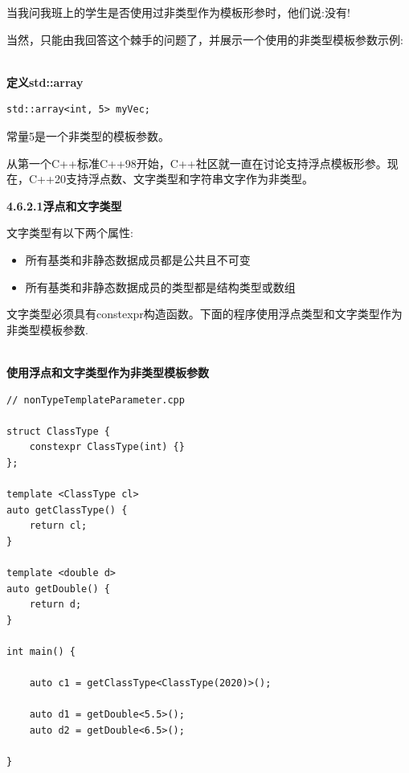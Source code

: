 \begin{tcolorbox}[breakable,enhanced jigsaw,colback=mygreen!5!white,colframe=mygreen!75!black,title={典型的非类型模板参数}]
	
当我问我班上的学生是否使用过非类型作为模板形参时，他们说:没有!

当然，只能由我回答这个棘手的问题了，并展示一个使用的非类型模板参数示例:

\hspace*{\fill} \\ %
\noindent
\textbf{定义std::array}
\begin{lstlisting}[style=styleCXX]
std::array<int, 5> myVec;
\end{lstlisting}

常量5是一个非类型的模板参数。
\end{tcolorbox}	

从第一个C++标准C++98开始，C++社区就一直在讨论支持浮点模板形参。现在，C++20支持浮点数、文字类型和字符串文字作为非类型。

\noindent
\textbf{4.6.2.1\hspace{0.2cm}浮点和文字类型}

文字类型有以下两个属性:

\begin{itemize}
\item 
所有基类和非静态数据成员都是公共且不可变

\item 
所有基类和非静态数据成员的类型都是结构类型或数组
\end{itemize}

文字类型必须具有constexpr构造函数。下面的程序使用浮点类型和文字类型作为非类型模板参数.

\hspace*{\fill} \\ %
\noindent
\textbf{使用浮点和文字类型作为非类型模板参数}
\begin{lstlisting}[style=styleCXX]
// nonTypeTemplateParameter.cpp

struct ClassType {
	constexpr ClassType(int) {}
};

template <ClassType cl>
auto getClassType() {
	return cl;
}

template <double d>
auto getDouble() {
	return d;
}

int main() {

	auto c1 = getClassType<ClassType(2020)>();
	
	auto d1 = getDouble<5.5>();
	auto d2 = getDouble<6.5>();

}
\end{lstlisting}

